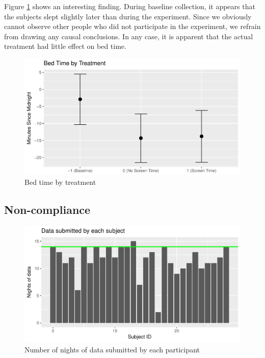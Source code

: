 \documentclass[12pt,]{article}
\begin{document}
Figure \ref{fig:bed_time_fig} shows an interesting finding. During
baseline collection, it appears that the subjects slept slightly later
than during the experiment. Since we obviously cannot observe other
people who did not participate in the experiment, we refrain from
drawing any causal conclusions. In any case, it is apparent that the
actual treatment had little effect on bed time.

\begin{figure}
\centering
\includegraphics{report_files/figure-latex/bed_time_fig-1.pdf}
\caption{\label{fig:bed_time_fig} Bed time by treatment}
\end{figure}

\hypertarget{non-compliance}{%
\subsection{Non-compliance}\label{non-compliance}}

\begin{figure}
\centering
\includegraphics{report_files/figure-latex/days_used-1.pdf}
\caption{\label{fig:days_used} Number of nights of data submitted by
each participant}
\end{figure}
\end{document}
